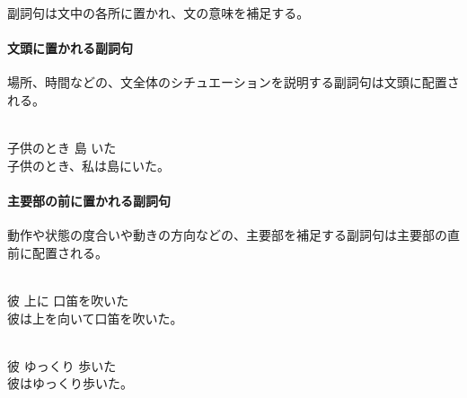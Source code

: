 副詞句は文中の各所に置かれ、文の意味を補足する。

\paragraph{文頭に置かれる副詞句}
場所、時間などの、文全体のシチュエーションを説明する副詞句は文頭に配置される。

\begin{exe}
    \ex {} \\
        子供のとき 島 いた \\
    \glt 子供のとき、私は島にいた。
\end{exe}

\paragraph{主要部の前に置かれる副詞句}
動作や状態の度合いや動きの方向などの、主要部を補足する副詞句は主要部の直前に配置される。

\begin{exe}
    \ex {} \\
        彼 上に 口笛を吹いた \\
    \glt 彼は上を向いて口笛を吹いた。
\end{exe}
\begin{exe}
    \ex \gll [k\'ap\'a] [piti] [t\'iv\textipa{\'O}p\'a] \\
        彼 ゆっくり 歩いた \\
    \glt 彼はゆっくり歩いた。
\end{exe}

